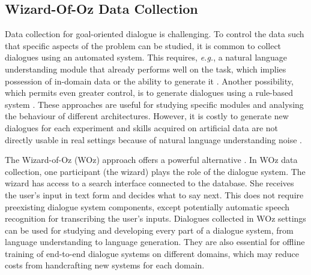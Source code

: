 \documentclass{article}
\theoremstyle{definition}
\begin{document}
\subsection{Wizard-Of-Oz Data Collection}
Data collection for goal-oriented dialogue is challenging. To control the data such that specific aspects of the problem can be studied, it is common to collect dialogues using an automated system. This requires, \textit{e.g.}, a natural language understanding module that already performs well on the task, which implies possession of in-domain data or the ability to generate it \citep{Raux:03,Henderson:14}. Another possibility, which permits even greater control, is to generate dialogues using a rule-based system \citep{Bordes:16}. These approaches are useful for studying specific modules and analysing the behaviour of different architectures. However, it is costly to generate new dialogues for each experiment and skills acquired on artificial data are not directly usable in real settings because of natural language understanding noise \citep{Bordes:16}.

The Wizard-of-Oz (WOz) approach offers a powerful alternative \citep{Kelley:84,Rieser:05,Wen:16}. In WOz data collection, one participant (the wizard) plays the role of the dialogue system. The wizard has access to a search interface connected to the database. She receives the user's input in text form and decides what to say next. This does not require preexisting dialogue system components, except potentially automatic speech recognition for transcribing the user's inputs. Dialogues collected in WOz settings can be used for studying and developing every part of a dialogue system, from language understanding to language generation. They are also essential for offline training of end-to-end dialogue systems \citep{Wen:16,Bordes:16} on different domains, which may reduce costs from handcrafting new systems for each domain. 
\end{document}
